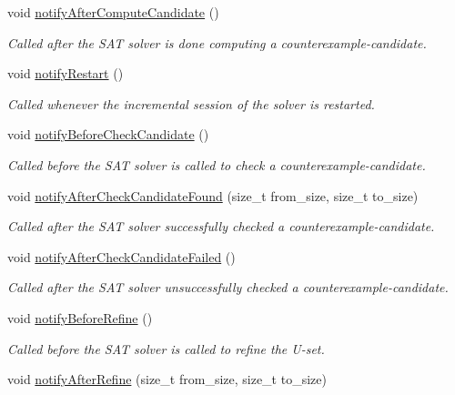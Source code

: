 \begin{DoxyCompactItemize}
void \hyperlink{classLearnStatisticsSAT_a4bebe07e8978f3866867ecf7ef432035}{notify\-After\-Compute\-Candidate} ()
\begin{DoxyCompactList}\small\item\em Called after the S\-A\-T solver is done computing a counterexample-\/candidate. \end{DoxyCompactList}\item 
void \hyperlink{classLearnStatisticsSAT_aecd9d61c097ec9209a19ee7dee5feff2}{notify\-Restart} ()
\begin{DoxyCompactList}\small\item\em Called whenever the incremental session of the solver is restarted. \end{DoxyCompactList}\item 
void \hyperlink{classLearnStatisticsSAT_aafb51499184443e1c38eeec61370b96a}{notify\-Before\-Check\-Candidate} ()
\begin{DoxyCompactList}\small\item\em Called before the S\-A\-T solver is called to check a counterexample-\/candidate. \end{DoxyCompactList}\item 
void \hyperlink{classLearnStatisticsSAT_a229bd4450b739bc802dff5c43a8e212b}{notify\-After\-Check\-Candidate\-Found} (size\-\_\-t from\-\_\-size, size\-\_\-t to\-\_\-size)
\begin{DoxyCompactList}\small\item\em Called after the S\-A\-T solver successfully checked a counterexample-\/candidate. \end{DoxyCompactList}\item 
void \hyperlink{classLearnStatisticsSAT_a84d6d5295f13de1943cf236565f0d135}{notify\-After\-Check\-Candidate\-Failed} ()
\begin{DoxyCompactList}\small\item\em Called after the S\-A\-T solver unsuccessfully checked a counterexample-\/candidate. \end{DoxyCompactList}\item 
void \hyperlink{classLearnStatisticsSAT_a2734b3bcda5ca2195ecdb174d98a1433}{notify\-Before\-Refine} ()
\begin{DoxyCompactList}\small\item\em Called before the S\-A\-T solver is called to refine the U-\/set. \end{DoxyCompactList}\item 
void \hyperlink{classLearnStatisticsSAT_a0f5e0bc85daa6d051b1cd0144b1f5bda}{notify\-After\-Refine} (size\-\_\-t from\-\_\-size, size\-\_\-t to\-\_\-size)

\end{DoxyCompactItemize}
